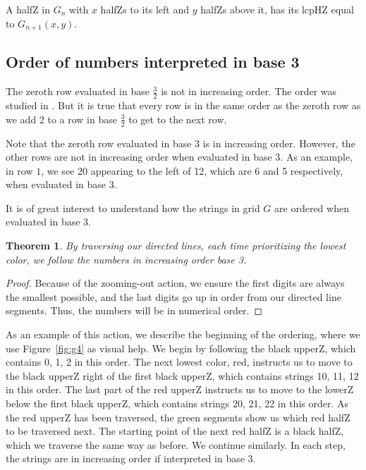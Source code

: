\documentclass[12pt,reqno]{article}
\theoremstyle{plain}
\newtheorem{theorem}{Theorem}
\theoremstyle{definition}
\theoremstyle{remark}
\begin{document}
A halfZ in $G_n$ with $x$ halfZs to its left and $y$ halfZs above it, has its lcpHZ equal to $G_{n+1}(x,y)$.

\subsection{Order of numbers interpreted in base 3}

The zeroth row evaluated in base $\frac{3}{2}$ is not in increasing order. The order was studied in \cite{PSS}. But it is true that every row is in the same order as the zeroth row as we add 2 to a row in base $\frac{3}{2}$ to get to the next row.

Note that the zeroth row evaluated in base $3$ is in increasing order. However, the other rows are not in increasing order when evaluated in base 3. As an example, in row $1$, we see 20 appearing to the left of 12, which are 6 and 5 respectively, when evaluated in base 3.

It is of great interest to understand how the strings in grid $G$ are ordered when evaluated in base 3.

\begin{theorem}\label{thm:order}
By traversing our directed lines, each time prioritizing the lowest color, we follow the numbers in increasing order base 3.
\end{theorem}
\begin{proof}
Because of the zooming-out action, we ensure the first digits are always the smallest possible, and the last digits go up in order from our directed line segments. Thus, the numbers will be in numerical order.
\end{proof}

As an example of this action, we describe the beginning of the ordering, where we use Figure~\ref{fig:g4} as visual help.
We begin by following the black upperZ, which contains 0, 1, 2 in this order. The next lowest color, red, instructs us to move to the black upperZ right of the first black upperZ, which contains strings 10, 11, 12 in this order. The last part of the red upperZ instructs us to move to the lowerZ below the first black upperZ, which contains strings 20, 21, 22 in this order. As the red upperZ has been traversed, the green segments show us which red halfZ to be traversed next. The starting point of the next red halfZ is a black halfZ, which we traverse the same way as before. We continue similarly. In each step, the strings are in increasing order if interpreted in base 3.
\end{document}
